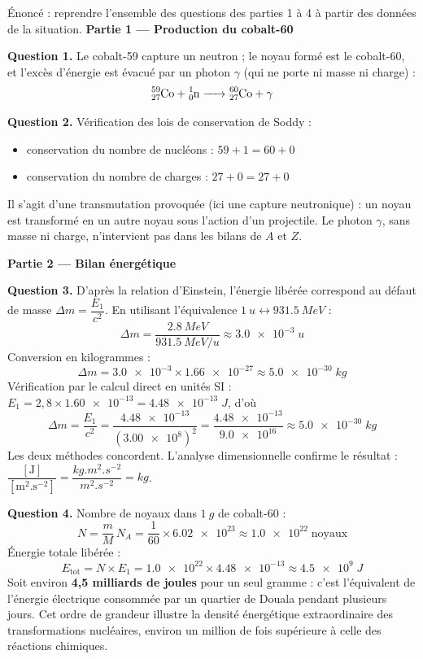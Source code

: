 \documentclass[11pt]{article}
\newcommand{\cle}[1]{{\popxbold\color{popdark}#1}}
\newcounter{popsec}
\newcounter{popsub}
\newcommand{\courssub}[1]{%
  \stepcounter{popsub}%
  \par\vspace{9pt}\noindent{\popxbold\fontsize{11.5}{13}\selectfont\color{popink}{\color{poporange}\thepopsec.\thepopsub}\hspace{6pt}#1}\par\nopagebreak\vspace{4pt}
}
\begin{document}
\courssub{Démarche et corrigé commenté}

\begin{exoresolu}
Énoncé : reprendre l'ensemble des questions des parties 1 à 4 à partir des données de la situation.
\tcblower
\textbf{Partie 1 — Production du cobalt-60}

\textbf{Question 1.} Le cobalt-59 capture un neutron ; le noyau formé est le cobalt-60, et l'excès d'énergie est évacué par un photon $\gamma$ (qui ne porte ni masse ni charge) :
\[ \ce{^{59}_{27}Co + ^{1}_{0}n -> ^{60}_{27}Co + \gamma} \]

\textbf{Question 2.} Vérification des lois de conservation de Soddy :
\begin{itemize}
\item conservation du nombre de nucléons : $59 + 1 = 60 + 0$ \checkmark
\item conservation du nombre de charges : $27 + 0 = 27 + 0$ \checkmark
\end{itemize}
Il s'agit d'une \cle{transmutation} provoquée (ici une capture neutronique) : un noyau est transformé en un autre noyau sous l'action d'un projectile. Le photon $\gamma$, sans masse ni charge, n'intervient pas dans les bilans de $A$ et $Z$.

\textbf{Partie 2 — Bilan énergétique}

\textbf{Question 3.} D'après la relation d'Einstein, l'énergie libérée correspond au défaut de masse $\Delta m = \dfrac{E_{1}}{c^{2}}$. En utilisant l'équivalence $\SI{1}{u} \leftrightarrow \SI{931,5}{MeV}$ :
\[ \Delta m = \frac{\SI{2,8}{MeV}}{\SI{931,5}{MeV/u}} \approx \num{3,0e-3} \; \si{u} \]
Conversion en kilogrammes :
\[ \Delta m = \num{3,0e-3} \times \num{1,66e-27} \approx \num{5,0e-30} \; \si{kg} \]
Vérification par le calcul direct en unités SI : $E_{1} = 2,8 \times \num{1,60e-13} = \num{4,48e-13} \; \si{J}$, d'où
\[ \Delta m = \frac{E_{1}}{c^{2}} = \frac{\num{4,48e-13}}{(\num{3,00e8})^{2}} = \frac{\num{4,48e-13}}{\num{9,0e16}} \approx \num{5,0e-30} \; \si{kg} \]
Les deux méthodes concordent. L'analyse dimensionnelle confirme le résultat : $\dfrac{[\text{J}]}{[\text{m}^{2}\text{.s}^{-2}]} = \dfrac{\si{kg.m^{2}.s^{-2}}}{\si{m^{2}.s^{-2}}} = \si{kg}$.

\textbf{Question 4.} Nombre de noyaux dans $\SI{1}{g}$ de cobalt-60 :
\[ N = \frac{m}{M}\,N_{A} = \frac{1}{60} \times \num{6,02e23} \approx \num{1,0e22} \; \text{noyaux} \]
Énergie totale libérée :
\[ E_{\text{tot}} = N \times E_{1} = \num{1,0e22} \times \num{4,48e-13} \approx \num{4,5e9} \; \si{J} \]
Soit environ \textbf{4,5 milliards de joules} pour un seul gramme : c'est l'équivalent de l'énergie électrique consommée par un quartier de Douala pendant plusieurs jours. Cet ordre de grandeur illustre la densité énergétique extraordinaire des transformations nucléaires, environ un million de fois supérieure à celle des réactions chimiques.


\end{exoresolu}
\end{document}

